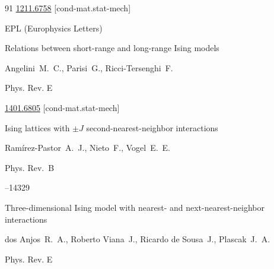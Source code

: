 \begin{thebibliography}{91}
\arxiv \href{http://arxiv.org/abs/1211.6758}{1211.6758} [cond-mat.stat-mech]


\jour EPL (Europhysics Letters) 








\paper  Relations between short-range and long-range Ising models

\by Angelini~M.~C., Parisi~G., Ricci-Tersenghi~F.

\jour Phys. Rev. E






\arxiv \href{http://arxiv.org/abs/1401.6805}{1401.6805} [cond-mat.stat-mech]




\paper  Ising lattices with $\pm J$ second-nearest-neighbor interactions

\by Ram\'irez-Pastor~A.~J.,  Nieto~F., Vogel~E.~E. 

\jour Phys. Rev.~B




--14329





\paper  Three-dimensional Ising model with nearest- and next-nearest-neighbor interactions

\by  dos Anjos~R.~A., Roberto Viana~J., Ricardo de Sousa~J., Plascak~J.~A. 

\jour Phys. Rev. E











\end{thebibliography}
